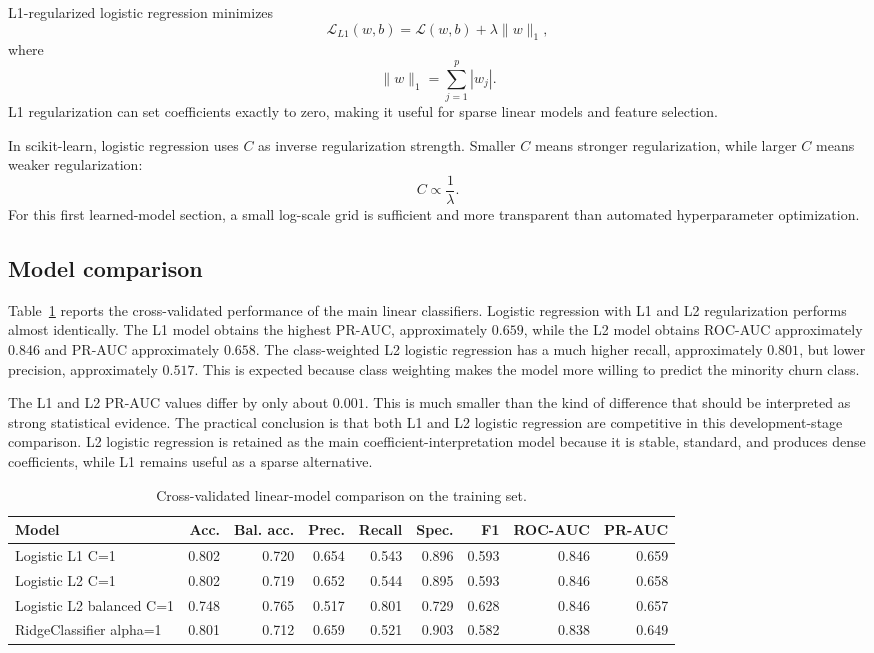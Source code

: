 L1-regularized logistic regression minimizes
\[
\mathcal{L}_{L1}(w,b)
=
\mathcal{L}(w,b) + \lambda \|w\|_1,
\]
where
\[
\|w\|_1 = \sum_{j=1}^p |w_j|.
\]
L1 regularization can set coefficients exactly to zero, making it useful for sparse linear models and feature selection.

In scikit-learn, logistic regression uses \(C\) as inverse regularization strength. Smaller \(C\) means stronger regularization, while larger \(C\) means weaker regularization:
\[
C \propto \frac{1}{\lambda}.
\]
For this first learned-model section, a small log-scale grid is sufficient and more transparent than automated hyperparameter optimization.

\subsection{Model comparison}

Table~\ref{tab:linear-model-comparison} reports the cross-validated performance of the main linear classifiers. Logistic regression with L1 and L2 regularization performs almost identically. The L1 model obtains the highest PR-AUC, approximately \(0.659\), while the L2 model obtains ROC-AUC approximately \(0.846\) and PR-AUC approximately \(0.658\). The class-weighted L2 logistic regression has a much higher recall, approximately \(0.801\), but lower precision, approximately \(0.517\). This is expected because class weighting makes the model more willing to predict the minority churn class.

The L1 and L2 PR-AUC values differ by only about \(0.001\). This is much smaller than the kind of difference that should be interpreted as strong statistical evidence. The practical conclusion is that both L1 and L2 logistic regression are competitive in this development-stage comparison. L2 logistic regression is retained as the main coefficient-interpretation model because it is stable, standard, and produces dense coefficients, while L1 remains useful as a sparse alternative.

\begin{table}[H]
\centering
\small
\begin{tabular}{lrrrrrrrr}
\toprule
Model & Acc. & Bal. acc. & Prec. & Recall & Spec. & F1 & ROC-AUC & PR-AUC \\
\midrule
Logistic L1 C=1 & 0.802 & 0.720 & 0.654 & 0.543 & 0.896 & 0.593 & 0.846 & 0.659 \\
Logistic L2 C=1 & 0.802 & 0.719 & 0.652 & 0.544 & 0.895 & 0.593 & 0.846 & 0.658 \\
Logistic L2 balanced C=1 & 0.748 & 0.765 & 0.517 & 0.801 & 0.729 & 0.628 & 0.846 & 0.657 \\
RidgeClassifier alpha=1 & 0.801 & 0.712 & 0.659 & 0.521 & 0.903 & 0.582 & 0.838 & 0.649 \\
\bottomrule
\end{tabular}
\caption{Cross-validated linear-model comparison on the training set.}
\label{tab:linear-model-comparison}
\end{table}

